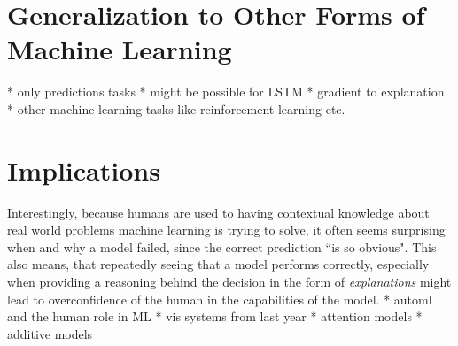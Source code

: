 \section{Generalization to Other Forms of Machine Learning}
* only predictions tasks
* might be possible for LSTM
* gradient to explanation
* other machine learning tasks like reinforcement learning etc.

\section{Implications}

Interestingly, because humans are used to having contextual knowledge about real world problems machine learning is trying to solve, it often seems surprising when and why a model failed, since the correct prediction ``is so obvious".
This also means, that repeatedly seeing that a model performs correctly, especially when providing a reasoning behind the decision in the form of \emph{explanations} might lead to overconfidence of the human in the capabilities of the model.
* automl and the human role in ML
* vis systems from last year
* attention models
* additive models




% 
% 


